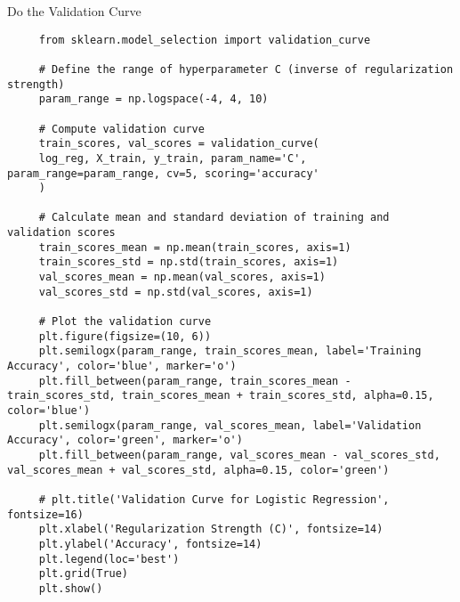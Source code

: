 \documentclass[letterpaper]{article}
\begin{document}
Do the Validation Curve

\begin{lstlisting}
     from sklearn.model_selection import validation_curve
     
     # Define the range of hyperparameter C (inverse of regularization strength)
     param_range = np.logspace(-4, 4, 10)
     
     # Compute validation curve
     train_scores, val_scores = validation_curve(
     log_reg, X_train, y_train, param_name='C', param_range=param_range, cv=5, scoring='accuracy'
     )
     
     # Calculate mean and standard deviation of training and validation scores
     train_scores_mean = np.mean(train_scores, axis=1)
     train_scores_std = np.std(train_scores, axis=1)
     val_scores_mean = np.mean(val_scores, axis=1)
     val_scores_std = np.std(val_scores, axis=1)
     
     # Plot the validation curve
     plt.figure(figsize=(10, 6))
     plt.semilogx(param_range, train_scores_mean, label='Training Accuracy', color='blue', marker='o')
     plt.fill_between(param_range, train_scores_mean - train_scores_std, train_scores_mean + train_scores_std, alpha=0.15, color='blue')
     plt.semilogx(param_range, val_scores_mean, label='Validation Accuracy', color='green', marker='o')
     plt.fill_between(param_range, val_scores_mean - val_scores_std, val_scores_mean + val_scores_std, alpha=0.15, color='green')
     
     # plt.title('Validation Curve for Logistic Regression', fontsize=16)
     plt.xlabel('Regularization Strength (C)', fontsize=14)
     plt.ylabel('Accuracy', fontsize=14)
     plt.legend(loc='best')
     plt.grid(True)
     plt.show()
\end{lstlisting}
\end{document}
